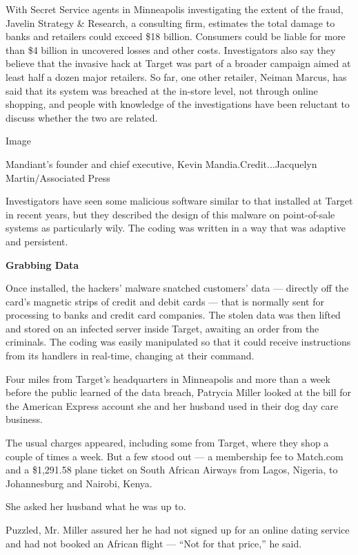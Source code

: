 With Secret Service agents in Minneapolis investigating the extent of
the fraud, Javelin Strategy \& Research, a consulting firm, estimates
the total damage to banks and retailers could exceed \$18 billion.
Consumers could be liable for more than \$4 billion in uncovered losses
and other costs. Investigators also say they believe that the invasive
hack at Target was part of a broader campaign aimed at least half a
dozen major retailers. So far, one other retailer, Neiman Marcus, has
said that its system was breached at the in-store level, not through
online shopping, and people with knowledge of the investigations have
been reluctant to discuss whether the two are related.

Image

Mandiant's founder and chief executive, Kevin Mandia.Credit...Jacquelyn
Martin/Associated Press

Investigators have seen some malicious software similar to that
installed at Target in recent years, but they described the design of
this malware on point-of-sale systems as particularly wily. The coding
was written in a way that was adaptive and persistent.

\textbf{Grabbing Data}

Once installed, the hackers' malware snatched customers' data ---
directly off the card's magnetic strips of credit and debit cards ---
that is normally sent for processing to banks and credit card companies.
The stolen data was then lifted and stored on an infected server inside
Target, awaiting an order from the criminals. The coding was easily
manipulated so that it could receive instructions from its handlers in
real-time, changing at their command.

Four miles from Target's headquarters in Minneapolis and more than a
week before the public learned of the data breach, Patrycia Miller
looked at the bill for the American Express account she and her husband
used in their dog day care business.

The usual charges appeared, including some from Target, where they shop
a couple of times a week. But a few stood out --- a membership fee to
Match.com and a \$1,291.58 plane ticket on South African Airways from
Lagos, Nigeria, to Johannesburg and Nairobi, Kenya.

She asked her husband what he was up to.

Puzzled, Mr. Miller assured her he had not signed up for an online
dating service and had not booked an African flight --- ``Not for that
price,'' he said.

